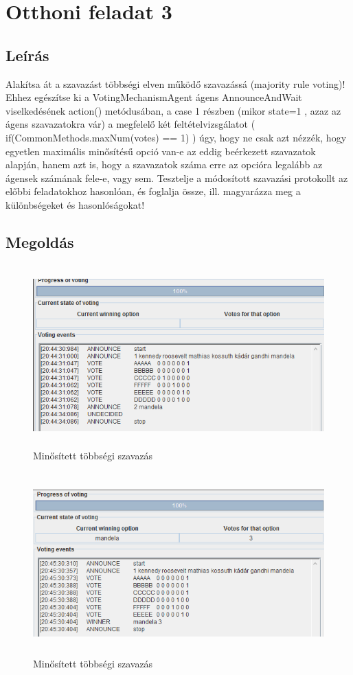 \section{Otthoni feladat 3}
\subsection{Leírás}
Alakítsa át a szavazást többségi elven működő szavazássá (majority rule voting)!
Ehhez  egészítse  ki  a  VotingMechanismAgent ágens  AnnounceAndWait
viselkedésének  action() metódusában, a  case 1 részben (mikor  state=1 , azaz az
ágens  szavazatokra  vár)  a  megfelelő  két  feltételvizsgálatot
( if(CommonMethods.maxNum(votes) == 1) ) úgy, hogy ne csak azt nézzék, hogy
egyetlen maximális minősítésű opció van-e az eddig beérkezett szavazatok alapján,
hanem azt is, hogy a szavazatok száma erre az opcióra legalább az ágensek számának
fele-e, vagy sem. Tesztelje a módosított szavazási protokollt az előbbi feladatokhoz
hasonlóan, és foglalja össze, ill. magyarázza meg a különbségeket és hasonlóságokat!
\subsection{Megoldás}

\begin{figure}[!h]
\begin{center}
\includegraphics[height=7cm]{figures/ofel3_1.png}
\caption{Minősített többségi szavazás}
\end{center}
\end{figure}
\begin{figure}[!h]
\begin{center}
\includegraphics[height=7cm]{figures/ofel3_2.png}
\caption{Minősített többségi szavazás}
\end{center}
\end{figure}


